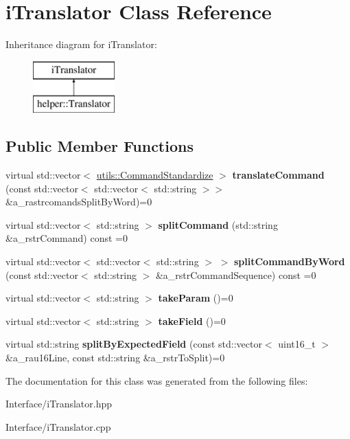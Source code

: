 \hypertarget{classi_translator}{}\section{i\+Translator Class Reference}
\label{classi_translator}
Inheritance diagram for i\+Translator\+:\begin{figure}[H]
\begin{center}
\leavevmode
\includegraphics[height=2.000000cm]{classi_translator}
\end{center}
\end{figure}
\subsection*{Public Member Functions}
\begin{DoxyCompactItemize}
\item 
\mbox{\label{classi_translator_a168e1c1c3aef4c8ae858902dc94188fe}} 
virtual std\+::vector$<$ \mbox{\hyperlink{structutils_1_1_command_standardize}{utils\+::\+Command\+Standardize}} $>$ {\bfseries translate\+Command} (const std\+::vector$<$ std\+::vector$<$ std\+::string $>$$>$ \&a\+\_\+rastrcomands\+Split\+By\+Word)=0
\item 
\mbox{\label{classi_translator_ab4d3afc4b16ae510e6997a24408542c4}} 
virtual std\+::vector$<$ std\+::string $>$ {\bfseries split\+Command} (std\+::string \&a\+\_\+rstr\+Command) const =0
\item 
\mbox{\label{classi_translator_ae2c695752ce954364b39ef62eafa9799}} 
virtual std\+::vector$<$ std\+::vector$<$ std\+::string $>$ $>$ {\bfseries split\+Command\+By\+Word} (const std\+::vector$<$ std\+::string $>$ \&a\+\_\+rstr\+Command\+Sequence) const =0
\item 
\mbox{\label{classi_translator_aac1c4ccb60df17d7442c24764c0000fc}} 
virtual std\+::vector$<$ std\+::string $>$ {\bfseries take\+Param} ()=0
\item 
\mbox{\label{classi_translator_af0a183b9de0aef51b544e843e4e6b9db}} 
virtual std\+::vector$<$ std\+::string $>$ {\bfseries take\+Field} ()=0
\item 
\mbox{\label{classi_translator_a3a43ef6576e7bb69a2ad55c8a31aa368}} 
virtual std\+::string {\bfseries split\+By\+Expected\+Field} (const std\+::vector$<$ uint16\+\_\+t $>$ \&a\+\_\+rau16\+Line, const std\+::string \&a\+\_\+rstr\+To\+Split)=0
\end{DoxyCompactItemize}


The documentation for this class was generated from the following files\+:\begin{DoxyCompactItemize}
\item 
Interface/i\+Translator.\+hpp\item 
Interface/i\+Translator.\+cpp\end{DoxyCompactItemize}
